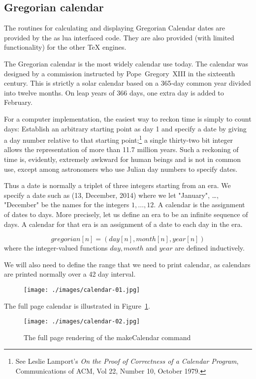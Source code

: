 \subsection{Gregorian calendar}

The routines for calculating and displaying Gregorian Calendar dates are provided by 
the  as lua interfaced code. They are also provided (with limited functionality) for the other TeX engines.

The Gregorian calendar is the most widely calendar use today. The calendar was designed by a commission instructed by Pope~Gregory~XIII in the sixteenth century. This is strictly a solar calendar based on a 365-day common year divided into twelve months. On leap years of 366 days, one extra day is added to February.

For a computer implementation, the easiest way to reckon time is simply to count
days: Establish an arbitrary starting point as day 1 and specify a date by giving
a day number relative to that starting point;\footnote{See Leslie Lamport's \textit{On the Proof of Correctness of a Calendar Program}, Communications of ACM, Vol 22, Number 10, October 1979.} a single thirty-two bit integer allows
the representation of more than 11.7 million years. Such a reckoning of time is,
evidently, extremely awkward for human beings and is not in common use, except
among astronomers who use Julian day numbers to specify dates.

Thus a date is normally a triplet of three integers starting from an era. We specify a date such as (13, December, 2014) where we let "January", \ldots, "December" be the names for the integers $1,\ldots,12$. A calendar is the assignment of dates to days.  More precisely, let us define an era to be an infinite sequence of days. A calendar for that era is an assignment of a date to each day in the era. 

\[gregorian[n] = (day[n], month[n], year[n])\]
where the integer-valued functions $day, month$ and $year$ are defined inductively.

We will also need to define the range that we need to print calendar, as calendars are printed normally over a 42 day interval.

\begin{figure}[h]
\centering
\texttt{[image: ./images/calendar-01.jpg]}
\end{figure}

The full page calendar is illustrated in Figure~\ref{girlcalendar}.
\begin{figure}[htb]
\centering
\texttt{[image: ./images/calendar-02.jpg]}
\caption{The full page rendering of the makeCalendar command}
\label{girlcalendar}
\end{figure}

